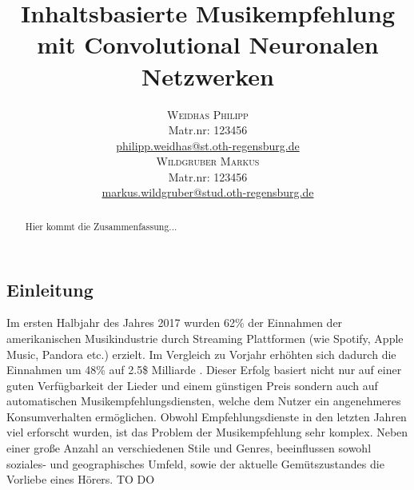 \documentclass[twosided,a4,10pt]{article}
\title{\vspace{-5mm}%
	\fontsize{20pt}{10pt}\selectfont
	\textbf{Inhaltsbasierte Musikempfehlung mit Convolutional Neuronalen Netzwerken}
}
\author{
	\large\begin{minipage}[t]{0.5\linewidth}
		\begin{center}
			\textsc{Weidhas Philipp}\\[2mm]
			\normalsize	Matr.nr: 123456\\
			\normalsize
			\href{mailto:philipp.weidhas@st.oth-regensburg.de}
			{philipp.weidhas@st.oth-regensburg.de}
		\end{center}
	\end{minipage}
	\begin{minipage}[t]{0.5\linewidth}
		\begin{center}
			\textsc{Wildgruber Markus}\\[2mm]
			\normalsize	Matr.nr: 123456\\
			\normalsize
			\href{mailto:markus.wildgruber@stud.oth-regensburg.de}
			{markus.wildgruber@stud.oth-regensburg.de}
		\end{center}
	\end{minipage}
}
\begin{document}
	
	\maketitle
	\thispagestyle{fancy}
	
	
	
	\begin{multicols}{2}
		
		\begin{abstract}
			\noindent Hier kommt die Zusammenfassung...
		\end{abstract}
		
		
		\section{Einleitung}
		
		Im ersten Halbjahr des Jahres 2017 wurden 62\% der Einnahmen der amerikanischen Musikindustrie durch Streaming Plattformen (wie Spotify, Apple Music, Pandora etc.) erzielt. Im Vergleich zu Vorjahr erhöhten sich dadurch die Einnahmen um 48\% auf 2.5\$ Milliarde \cite{friedlander}. Dieser Erfolg basiert nicht nur auf einer guten Verfügbarkeit der Lieder und einem günstigen Preis sondern auch auf automatischen Musikempfehlungsdiensten, welche dem Nutzer ein angenehmeres Konsumverhalten ermöglichen.\newline
		Obwohl Empfehlungsdienste in den letzten Jahren viel erforscht wurden, ist das Problem der Musikempfehlung sehr komplex. Neben einer große Anzahl an verschiedenen Stile und Genres, beeinflussen sowohl soziales- und geographisches Umfeld, sowie der aktuelle Gemütszustandes die Vorliebe eines Hörers. \cite{oord}\newline
		TO DO \newline\\
		

\end{multicols}
\end{document}
